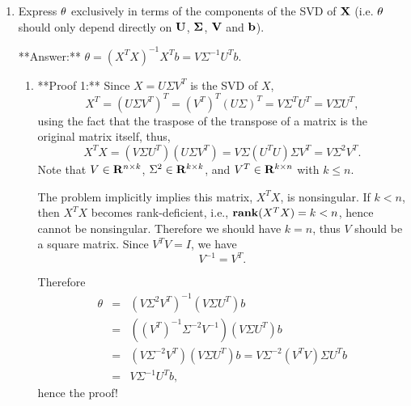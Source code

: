 \begin{enumerate}
\item Express $\bf{\theta}$ exclusively in terms of the components of the SVD of $\bf{X}$ (i.e. $\bf{\theta}$ should only depend directly on $\bf{U}$, $\bf{\Sigma}$, $\bf{V}$ and $\bf{b}$).

**Answer:** $\theta = (X^TX)^{-1} X^T b = V \Sigma^{-1} U^T b$.

\begin{solution}
\begin{enumerate}







\item

**Proof 1:** Since  $X = U \Sigma V^T$ is the SVD of $X$,
\begin{equation}
X^T = (U\Sigma V^T)^T = (V^T)^T (U\Sigma)^T = V \Sigma^T U^T = V \Sigma U^T,
\end{equation}
using the fact that the traspose of the transpose of a matrix is the original matrix itself,
thus,
\begin{equation}
X^TX
= (V \Sigma U^T) (U \Sigma V^T) 
= V \Sigma (U^T U) \Sigma V^T
= V \Sigma^2 V^T.
\end{equation}
Note that 
$V\in\mathbf{R}^{n\times k}$,
$\Sigma^2\in\mathbf{R}^{k\times k}$,
and
$V^T\in\mathbf{R}^{k\times n}$ with $k\leq n$.

The problem implicitly implies this matrix, $X^TX$, is nonsingular. If $k < n$, then $X^TX$ becomes rank-deficient, i.e., $\mathbf{rank}(X^TX) = k < n$, hence cannot be nonsingular.
Therefore we should have $k=n$, thus $V$ should be a square matrix.
Since $V^T V=I$, we have
\begin{equation}
V^{-1} = V^T.
\end{equation}

Therefore
\begin{eqnarray*}
\theta
&=&
(V \Sigma^2 V^T)^{-1} (V \Sigma U^T) b
\\
&=&
((V^T)^{-1} \Sigma^{-2} V^{-1}) (V \Sigma U^T) b
\\
&=&
(V \Sigma^{-2} V^T )(V \Sigma U^T) b = V \Sigma^{-2} (V^TV) \Sigma U^T b
\\
&=&
V \Sigma^{-1} U^T b,
\end{eqnarray*}
hence the proof!










\end{enumerate}
\end{solution}
\end{enumerate}
